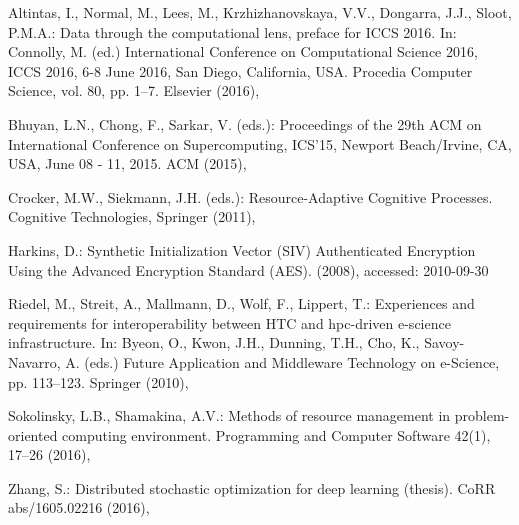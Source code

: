 \documentclass{superfri}
\begin{document}


\begin{thebibliography}{9}
	
	Altintas, I., Normal, M., Lees, M., Krzhizhanovskaya, V.V., Dongarra, J.J., Sloot, P.M.A.: Data through the computational lens, preface for ICCS 2016. In: Connolly, M. (ed.) International Conference on Computational Science 2016, ICCS 2016, 6-8 June 2016, San
	Diego, California, USA. Procedia Computer Science, vol. 80, pp. 1–7. Elsevier (2016), 
	
	Bhuyan, L.N., Chong, F., Sarkar, V. (eds.): Proceedings of the 29th ACM on International Conference on Supercomputing, ICS’15, Newport Beach/Irvine, CA, USA, June 08 - 11, 2015. ACM (2015), 

	Crocker, M.W., Siekmann, J.H. (eds.): Resource-Adaptive Cognitive Processes. Cognitive Technologies, Springer (2011), 
	
	Harkins, D.: Synthetic Initialization Vector (SIV) Authenticated Encryption Using the Advanced Encryption Standard (AES).  (2008), accessed: 2010-09-30
	
	Riedel, M., Streit, A., Mallmann, D., Wolf, F., Lippert, T.: Experiences and requirements for interoperability between HTC and hpc-driven e-science infrastructure. In: Byeon, O., Kwon, J.H., Dunning, T.H., Cho, K., Savoy-Navarro, A. (eds.) Future Application and Middleware Technology on e-Science, pp. 113–123. Springer (2010), 		
	
	Sokolinsky, L.B., Shamakina, A.V.: Methods of resource management in problem-oriented computing environment. Programming and Computer Software 42(1), 17–26 (2016), 
	
	Zhang, S.: Distributed stochastic optimization for deep learning (thesis). CoRR abs/1605.02216 (2016), 

\end{thebibliography}

\end{document}
